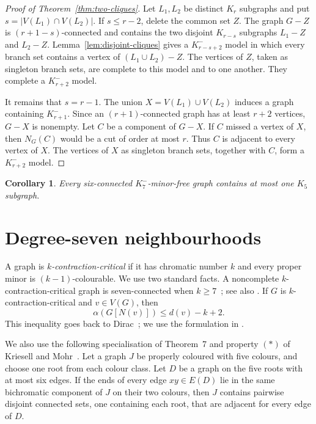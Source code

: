 \documentclass[11pt]{amsart}
\newtheorem{corollary}[theorem]{Corollary}
\newcommand{\N}{N}
\begin{document}
\begin{proof}[Proof of Theorem~\ref{thm:two-cliques}]
Let $L_1,L_2$ be distinct $K_r$ subgraphs and put
$s=|V(L_1)\cap V(L_2)|$.  If $s\leq r-2$, delete the common set $Z$.
The graph $G-Z$ is $(r+1-s)$-connected and contains the two disjoint
$K_{r-s}$ subgraphs $L_1-Z$ and $L_2-Z$.  Lemma~\ref{lem:disjoint-cliques}
gives a $K_{r-s+2}^{-}$ model in which every branch set contains a vertex
of $(L_1\cup L_2)-Z$.  The vertices of $Z$, taken as singleton branch
sets, are complete to this model and to one another.  They complete a
$K_{r+2}^{-}$ model.

It remains that $s=r-1$.  The union $X=V(L_1)\cup V(L_2)$ induces a graph
containing $K_{r+1}^{-}$.  Since an $(r+1)$-connected graph has at least
$r+2$ vertices, $G-X$ is nonempty.  Let $C$ be a component of $G-X$.  If
$C$ missed a vertex of $X$, then $\N_G(C)$ would be a cut of order at most
$r$.  Thus $C$ is adjacent to every vertex of $X$.  The vertices of $X$
as singleton branch sets, together with $C$, form a $K_{r+2}^{-}$ model.
\end{proof}

\begin{corollary}\label{cor:unique-k5}
Every six-connected $K_7^{-}$-minor-free graph contains at most one $K_5$
subgraph.
\end{corollary}

\section{Degree-seven neighbourhoods}

A graph is \emph{$k$-contraction-critical} if it has chromatic number $k$
and every proper minor is $(k-1)$-colourable.  We use two standard facts.
A noncomplete $k$-contraction-critical graph is seven-connected when
$k\geq7$~\cite[Satz~6]{Mader1968Connectivity}; see also
\cite[Theorem~1.8]{RolekSong2017}.  If $G$ is $k$-contraction-critical and
$v\in V(G)$, then
\[
        \alpha(G[\N(v)])\leq d(v)-k+2.                 \tag{3.1}
\]
This inequality goes back to Dirac~\cite{Dirac1960}; we use the formulation
in \cite[Lemma~1.6(i)]{RolekSong2017}.

We also use the following specialisation of Theorem~7 and property $(*)$
of Kriesell and Mohr~\cite[Theorem~7]{KriesellMohr2019}.  Let a graph $J$
be properly coloured with five colours, and choose one root from each
colour class.  Let $D$ be a graph on the five roots with at most six edges.
If the ends of every edge $xy\in E(D)$ lie in the same bichromatic
component of $J$ on their two colours, then $J$ contains pairwise disjoint
connected sets, one containing each root, that are adjacent for every edge
of $D$.
\end{document}
